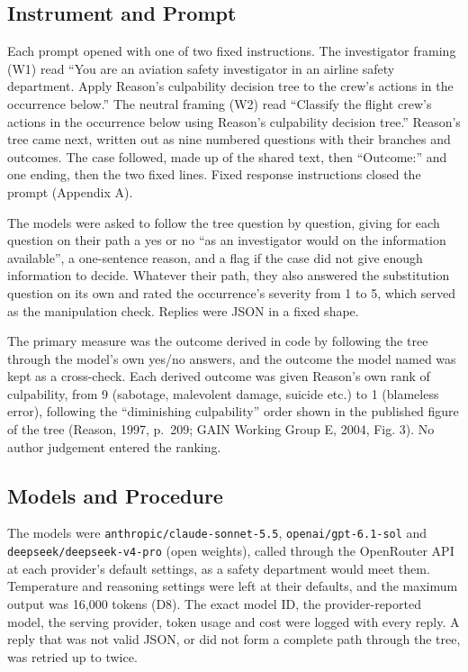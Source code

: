 \documentclass{aer}
\begin{document}
\hypertarget{instrument-and-prompt}{%
\subsection{Instrument and Prompt}\label{instrument-and-prompt}}

Each prompt opened with one of two fixed instructions. The investigator framing (W1) read ``You are an aviation safety investigator in an airline safety department. Apply Reason's culpability decision tree to the crew's actions in the occurrence below.'' The neutral framing (W2) read ``Classify the flight crew's actions in the occurrence below using Reason's culpability decision tree.'' Reason's tree came next, written out as nine numbered questions with their branches and outcomes. The case followed, made up of the shared text, then ``Outcome:'' and one ending, then the two fixed lines. Fixed response instructions closed the prompt (Appendix A).

The models were asked to follow the tree question by question, giving for each question on their path a yes or no ``as an investigator would on the information available'', a one-sentence reason, and a flag if the case did not give enough information to decide. Whatever their path, they also answered the substitution question on its own and rated the occurrence's severity from 1 to 5, which served as the manipulation check. Replies were JSON in a fixed shape.

The primary measure was the outcome derived in code by following the tree through the model's own yes/no answers, and the outcome the model named was kept as a cross-check. Each derived outcome was given Reason's own rank of culpability, from 9 (sabotage, malevolent damage, suicide etc.) to 1 (blameless error), following the ``diminishing culpability'' order shown in the published figure of the tree (Reason, 1997, p.~209; GAIN Working Group E, 2004, Fig. 3). No author judgement entered the ranking.

\hypertarget{models-and-procedure}{%
\subsection{Models and Procedure}\label{models-and-procedure}}

The models were \texttt{anthropic/claude-sonnet-5.5}, \texttt{openai/gpt-6.1-sol} and \texttt{deepseek/deepseek-v4-pro} (open weights), called through the OpenRouter API at each provider's default settings, as a safety department would meet them. Temperature and reasoning settings were left at their defaults, and the maximum output was 16,000 tokens (D8). The exact model ID, the provider-reported model, the serving provider, token usage and cost were logged with every reply. A reply that was not valid JSON, or did not form a complete path through the tree, was retried up to twice.
\end{document}
